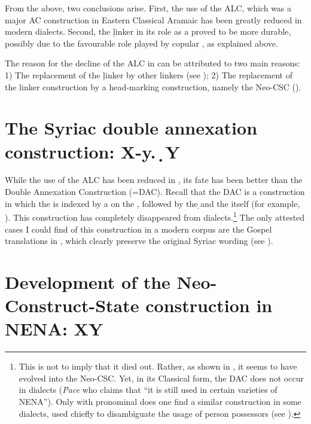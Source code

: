   
From the above, two conclusions arise. First, the use of the ALC, which was a major AC construction in Eastern Classical Aramaic has been greatly reduced in modern dialects. Second, the \d linker in its role as a  proved to be more durable, possibly due to the favourable role played by copular \secns, as explained above. 

The reason for the decline of the ALC in  can be attributed to two main reasons: 1) The replacement of the \d linker by other linkers (see ); 2) The replacement of the linker construction by a head-marking construction, namely the Neo-CSC (). 

\section{The Syriac double annexation construction: X-y.\poss\ \d{}Y} \label{ss:dist_DAC}

While the use of the ALC has been reduced in , its fate has been better than the Double Annexation Construction (=DAC). Recall that the DAC is a construction in which the \secn is indexed by a  on the \prim, followed by the \d \lnk* and the \secn itself (for example, ). This construction has completely disappeared from  dialects.\footnote{This is not to imply that it died out. Rather, as shown in , it seems to have evolved into the Neo-CSC. Yet,  in its Classical form, the DAC does not occur in  dialects (\textit{Pace} \citet[383]{MengozziExtended} who claims that \enquote{it is still used in certain varieties of NENA}). Only with pronominal \secns does one find a similar construction in some dialects, used chiefly to disambiguate the usage of \third person possessors (see ).} The only attested cases I could find of this construction in a modern  corpus are the Gospel translations in \Qar, which clearly preserve the original Syriac wording (see ).

\section[Development of the Neo-CSC in NENA: X\ed Y]{Development of the Neo-Construct-State construction in NENA: X\ed Y} \label{ss:neo-CSC}
\largerpage[-2]


